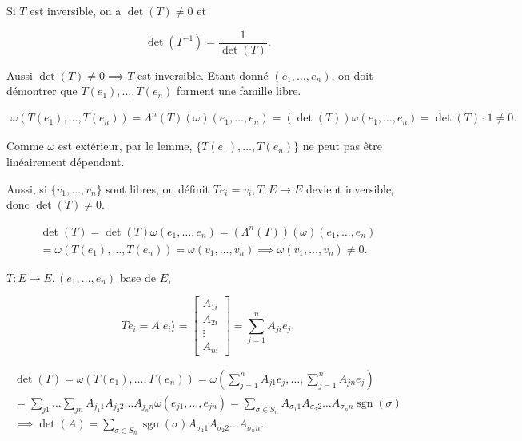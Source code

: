 \documentclass[french]{article}
\theoremstyle{definition}
\begin{document}
Si \(T\) est inversible, on a \(\operatorname{det}(T) \neq 0\) et

\[\operatorname{det}(T ^{-1}) = \frac{1}{\operatorname{det}(T)}.\]

Aussi \(\operatorname{det}(T) \neq 0 \implies T\) est inversible. Etant donné \((e_1, \dots, e_n)\), on doit démontrer que \(T(e_1), \dots, T(e_n)\) forment une famille libre.

\begin{gather*}
  \omega(T(e_1), \dots, T(e_n)) = \Lambda ^{n}(T)(\omega)(e_1, \dots, e_n) = (\operatorname{det}(T)) \omega(e_1, \dots, e_n) = \operatorname{det}(T) \cdot 1 \neq 0.
\end{gather*}

Comme \(\omega\) est  ext\'erieur, par le lemme,  \(\{ T(e_1), \dots, T(e_n)\}\) ne peut pas être linéairement dépendant.


  Aussi, si \(\{ v_1, \dots, v_n \} \) sont libres, on définit \(T e_i = v_i, T : E \to E\) devient inversible, donc \(\operatorname{det}(T) \neq 0\).

  \begin{gather*}
    \operatorname{det}(T) = \operatorname{det}(T)\omega(e_1, \dots, e_n) = (\Lambda ^{n}(T))(\omega)(e_1, \dots, e_n) \\
    = \omega(T(e_1), \dots, T(e_n)) = \omega(v_1, \dots, v_n) \implies \omega(v_1, \dots, v_n) \neq 0.
  \end{gather*}
 \bigskip


\(T : E \to E, (e_1, \dots, e_n) \) base de \(E\),

\[T e_i =A \lvert e_i \rangle = \left[\begin{matrix}
  A_{1i} \\
  A _{2i} \\
  \vdots \\
  A _{ni}
\end{matrix}\right] = \sum_{j=1}^{n} A _{ji} e_j.\]

\begin{gather*}
  \operatorname{det}(T) = \omega(T(e_1), \dots, T(e_n)) = \omega(\sum_{j=1}^{n} A _{j1}e_j, \dots, \sum_{j=1}^{n} A _{jn} e_j  ) \\
  = \sum_{j1}^{} \dots \sum_{jn}^{} A _{j_1 1} A _{j_2 2} \dots A _{j_n n} \omega(e _{j1}, \dots, e _{jn}) = \sum_{\sigma \in S_n}^{} A _{\sigma_1 1} A _{\sigma_2 2} \dots A _{\sigma_n n} \operatorname{sgn}(\sigma) \\
  \implies \operatorname{det}(A) = \sum_{\sigma \in S_n}^{} \operatorname{sgn}(\sigma) A _{\sigma_1 1} A _{\sigma_2 2} \dots A _{\sigma_n n}.
\end{gather*}
\end{document}
